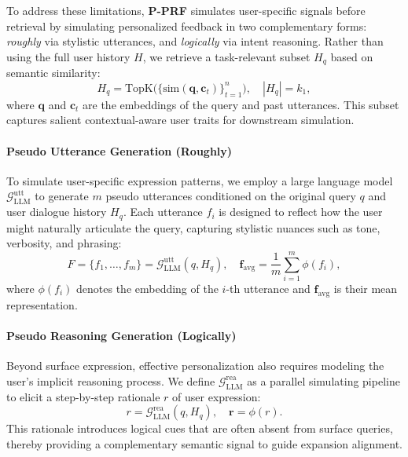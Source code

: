 To address these limitations, \textbf{P-PRF} simulates user-specific signals before retrieval by simulating personalized feedback in two complementary forms: \emph{roughly} via stylistic utterances, and \emph{logically} via intent reasoning. Rather than using the full user history $H$, we retrieve a task-relevant subset $H_q$  based on semantic similarity:
\begin{equation}
H_q= \text{TopK}\big(\{\text{sim}(\mathbf{q}, \mathbf{c}_t)\}_{t=1}^n\big), \quad |H_q| = k_1,
\end{equation}
where $\mathbf{q}$ and $\mathbf{c}_t$ are the embeddings of the query and past utterances. This subset captures salient contextual-aware user traits for downstream simulation.

\paragraph{Pseudo Utterance Generation (Roughly)}  
To simulate user-specific expression patterns, we employ a large language model $\mathcal{G}^{\text{utt}}_{\text{LLM}}$ to generate $m$ pseudo utterances conditioned on the original query $q$ and user dialogue history $H_q$. Each utterance $f_i$ is designed to reflect how the user might naturally articulate the query, capturing stylistic nuances such as tone, verbosity, and phrasing:
\begin{equation}
F = \{f_1, \dots, f_m\} = \mathcal{G}^{\text{utt}}_{\text{LLM}}(q, H_q), \quad \mathbf{f}_{\text{avg}} = \frac{1}{m} \sum_{i=1}^{m} \phi(f_i),
\end{equation}
where $\phi(f_i)$ denotes the embedding of the $i$-th utterance and $\mathbf{f}_{\text{avg}}$ is their mean representation.

\paragraph{Pseudo Reasoning Generation (Logically)}  
Beyond surface expression, effective personalization also requires modeling the user’s implicit reasoning process. We define $\mathcal{G}^{\text{rea}}_{\text{LLM}}$ as a parallel simulating pipeline to elicit a step-by-step rationale $r$ of user expression:
\begin{equation}
r = \mathcal{G}^{\text{rea}}_{\text{LLM}}(q, H_q), \quad \mathbf{r} = \phi(r).
\end{equation}
This rationale introduces logical cues that are often absent from surface queries, thereby providing a complementary semantic signal to guide expansion alignment.


